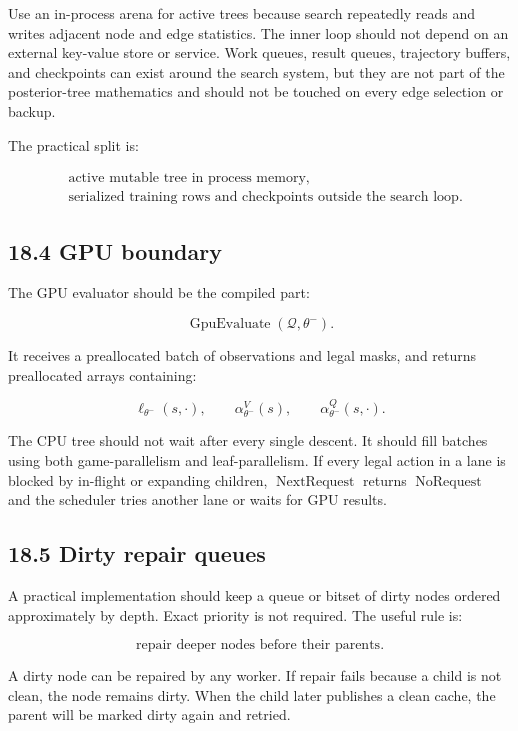 \documentclass[11pt]{article}
\newcommand{\NextRequest}{\operatorname{NextRequest}}
\newcommand{\GpuEvaluate}{\operatorname{GpuEvaluate}}
\newcommand{\NoRequest}{\operatorname{NoRequest}}
\begin{document}
Use an in-process arena for active trees because search repeatedly reads and
writes adjacent node and edge statistics. The inner loop should not depend on an
external key-value store or service. Work queues, result queues, trajectory
buffers, and checkpoints can exist around the search system, but they are not
part of the posterior-tree mathematics and should not be touched on every edge
selection or backup.

The practical split is:

\[
\begin{aligned}
&\text{active mutable tree in process memory},\\
&\text{serialized training rows and checkpoints outside the search loop}.
\end{aligned}
\]

\subsection*{18.4 GPU boundary}

The GPU evaluator should be the compiled part:

\[
\GpuEvaluate(\mathcal{Q},\theta^-).
\]

It receives a preallocated batch of observations and legal masks, and returns
preallocated arrays containing:

\[
\ell_{\theta^-}(s,\cdot),
\qquad
\alpha_{\theta^-}^V(s),
\qquad
\alpha_{\theta^-}^Q(s,\cdot).
\]

The CPU tree should not wait after every single descent. It should fill batches
using both game-parallelism and leaf-parallelism. If every legal action in a lane
is blocked by in-flight or expanding children, \(\NextRequest\) returns \(\NoRequest\) and the
scheduler tries another lane or waits for GPU results.

\subsection*{18.5 Dirty repair queues}

A practical implementation should keep a queue or bitset of dirty nodes ordered
approximately by depth. Exact priority is not required. The useful rule is:

\[
\text{repair deeper nodes before their parents}.
\]

A dirty node can be repaired by any worker. If repair fails because a child is
not clean, the node remains dirty. When the child later publishes a clean cache,
the parent will be marked dirty again and retried.
\end{document}
